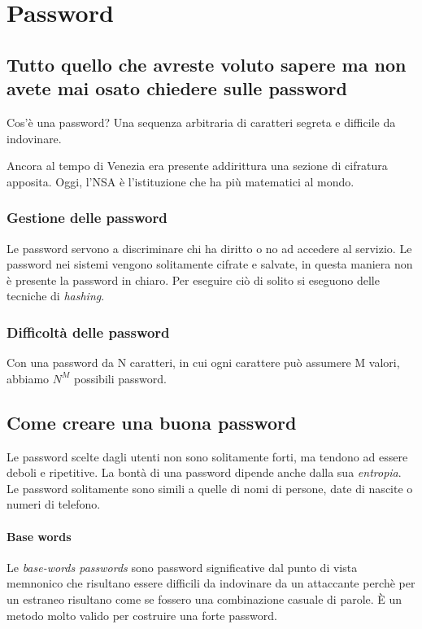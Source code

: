 \section{Password}
\label{Password}

\subsection{Tutto quello che avreste voluto sapere ma non avete mai osato
chiedere sulle password}

Cos'è una password? Una sequenza arbitraria di caratteri segreta e difficile da
indovinare.

Ancora al tempo di Venezia era presente addirittura una sezione di cifratura
apposita. Oggi, l'NSA è l'istituzione che ha più matematici al mondo.

\subsubsection{Gestione delle password}

Le password servono a discriminare chi ha diritto o no ad accedere al servizio.
Le password nei sistemi vengono solitamente cifrate e salvate, in questa
maniera non è presente la password in chiaro. Per eseguire ciò di solito si
eseguono delle tecniche di \textit{hashing}.

\subsubsection{Difficoltà delle password}

Con una password da N caratteri, in cui ogni carattere può assumere M valori,
abbiamo $N^M$ possibili password.

\subsection{Come creare una buona password}

Le password scelte dagli utenti non sono solitamente forti, ma tendono ad
essere deboli e ripetitive. La bontà di una password dipende anche dalla sua
\textit{entropia}.
Le password solitamente sono simili a quelle di nomi di persone, date di
nascite o numeri di telefono.

\paragraph*{Base words}
Le \textit{base-words passwords} sono password significative dal punto di vista
memnonico che risultano essere difficili da indovinare da un attaccante perchè
per un estraneo risultano come se fossero una combinazione casuale di parole.
È un metodo molto valido per costruire una forte password.

